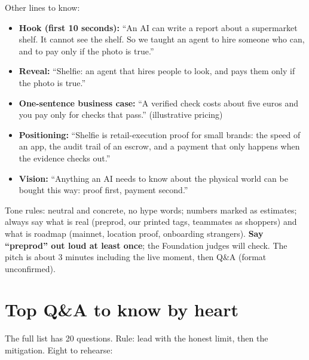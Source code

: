 Other lines to know:
\begin{itemize}
  \item \textbf{Hook (first 10 seconds):} ``An AI can write a report about a supermarket shelf. It cannot see the shelf. So we taught an agent to hire someone who can, and to pay only if the photo is true.''
  \item \textbf{Reveal:} ``Shelfie: an agent that hires people to look, and pays them only if the photo is true.''
  \item \textbf{One-sentence business case:} ``A verified check costs about five euros and you pay only for checks that pass.'' (illustrative pricing)
  \item \textbf{Positioning:} ``Shelfie is retail-execution proof for small brands: the speed of an app, the audit trail of an escrow, and a payment that only happens when the evidence checks out.''
  \item \textbf{Vision:} ``Anything an AI needs to know about the physical world can be bought this way: proof first, payment second.''
\end{itemize}

Tone rules: neutral and concrete, no hype words; numbers marked as estimates; always say what is real (preprod, our printed tags, teammates as shoppers) and what is roadmap (mainnet, location proof, onboarding strangers). \textbf{Say ``preprod'' out loud at least once}; the Foundation judges will check. The pitch is about 3 minutes including the live moment, then Q\&A (format unconfirmed).

\section{Top Q\&A to know by heart}
The full list has 20 questions. Rule: lead with the honest limit, then the mitigation. Eight to rehearse:

